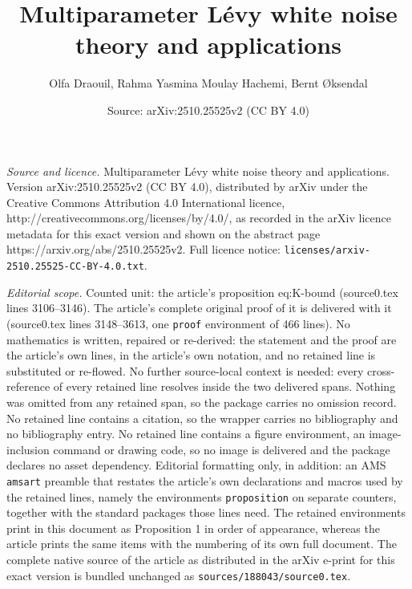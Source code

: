 \documentclass[10pt,a4paper]{amsart}
\title{Multiparameter L\'evy white noise theory and applications}
\author{Olfa Draouil, Rahma Yasmina Moulay Hachemi, Bernt {\O}ksendal}
\date{Source: arXiv:2510.25525v2 (CC BY 4.0)}
\begin{document}
\maketitle

\noindent\emph{Source and licence.} Multiparameter L\'evy white noise theory and applications. Version arXiv:2510.25525v2 (CC BY 4.0), distributed by arXiv under the Creative Commons Attribution 4.0 International licence, http://creativecommons.org/licenses/by/4.0/, as recorded in the arXiv licence metadata for this exact version and shown on the abstract page https://arxiv.org/abs/2510.25525v2. Full licence notice: \texttt{licenses/arxiv-2510.25525-CC-BY-4.0.txt}.\par\smallskip

\noindent\textit{Editorial scope.} Counted unit: the article's proposition eq:K-bound (source0.tex lines 3106--3146). The article's complete original proof of it is delivered with it (source0.tex lines 3148--3613, one \texttt{proof} environment of 466 lines). No mathematics is written, repaired or re-derived: the statement and the proof are the article's own lines, in the article's own notation, and no retained line is substituted or re-flowed.  No further source-local context is needed: every cross-reference of every retained line resolves inside the two delivered spans.  Nothing was omitted from any retained span, so the package carries no omission record.  No retained line contains a citation, so the wrapper carries no bibliography and no bibliography entry.  No retained line contains a figure environment, an image-inclusion command or drawing code, so no image is delivered and the package declares no asset dependency.  Editorial formatting only, in addition: an AMS \texttt{amsart} preamble that restates the article's own declarations and macros used by the retained lines, namely the environments \texttt{proposition} on separate counters, together with the standard packages those lines need.  The retained environments print in this document as Proposition 1 in order of appearance, whereas the article prints the same items with the numbering of its own full document.  The complete native source of the article as distributed in the arXiv e-print for this exact version is bundled unchanged as \texttt{sources/188043/source0.tex}.
\end{document}
